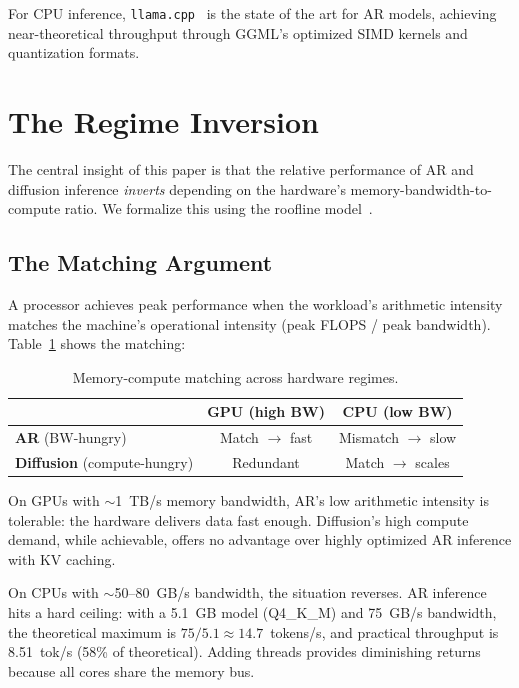 \documentclass[11pt]{article}
\begin{document}
For CPU inference, \texttt{llama.cpp}~\cite{gerganov2023b} is the state of the art for
AR models, achieving near-theoretical throughput through GGML's optimized SIMD kernels
and quantization formats.


\section{The Regime Inversion}

The central insight of this paper is that the relative performance of AR and diffusion
inference \emph{inverts} depending on the hardware's memory-bandwidth-to-compute ratio.
We formalize this using the roofline model~\cite{williams2009}.

\subsection{The Matching Argument}

A processor achieves peak performance when the workload's arithmetic intensity matches
the machine's operational intensity (peak FLOPS / peak bandwidth). Table~\ref{tab:matching}
shows the matching:

\begin{table}[h]
\centering
\caption{Memory-compute matching across hardware regimes.}
\label{tab:matching}
\begin{tabular}{lcc}
\toprule
 & \textbf{GPU} (high BW) & \textbf{CPU} (low BW) \\
\midrule
\textbf{AR} (BW-hungry) & Match $\to$ fast & Mismatch $\to$ slow \\
\textbf{Diffusion} (compute-hungry) & Redundant & Match $\to$ scales \\
\bottomrule
\end{tabular}
\end{table}

On GPUs with $\sim$1~TB/s memory bandwidth, AR's low arithmetic intensity is tolerable:
the hardware delivers data fast enough. Diffusion's high compute demand, while achievable,
offers no advantage over highly optimized AR inference with KV caching.

On CPUs with $\sim$50--80~GB/s bandwidth, the situation reverses. AR inference hits a
hard ceiling: with a 5.1~GB model (Q4\_K\_M) and 75~GB/s bandwidth, the theoretical
maximum is $75/5.1 \approx 14.7$~tokens/s, and practical throughput is 8.51~tok/s
(58\% of theoretical). Adding threads provides diminishing returns because all cores
share the memory bus.
\end{document}
